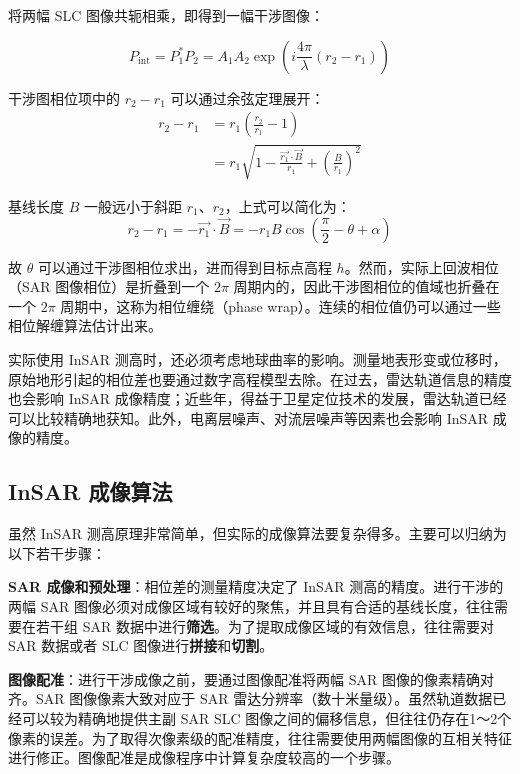 将两幅 SLC 图像共轭相乘，即得到一幅干涉图像：

\begin{equation}
    P_{\textrm{int}} = P_1^* P_2 =  A_1 A_2 \exp(i \frac{4\pi}{\lambda}(r_2 - r_1))
\end{equation}

干涉图相位项中的 $ r_2 - r_1 $ 可以通过余弦定理展开：
\begin{equation}
\begin{split}
    r_2 - r_1 &= r_1 (\frac{r_2}{r_1} - 1) \\
              &= r_1 \sqrt{1- \frac{\vec{r_1} \cdot \vec{B}}{r_1} + (\frac{B}{r_1})^2}
\end{split}
\end{equation}

基线长度 $B$ 一般远小于斜距 $r_1$、$r_2$，上式可以简化为：
\begin{equation}
    r_2 - r_1 = - \vec{r_1} \cdot \vec{B} = - r_1 B \cos(\frac{\pi}{2} - \theta + \alpha)
\end{equation}

故 $\theta$ 可以通过干涉图相位求出，进而得到目标点高程 $h$。然而，实际上回波相位（SAR 图像相位）是折叠到一个 $2\pi$ 周期内的，因此干涉图相位的值域也折叠在一个 $2\pi$ 周期中，这称为相位缠绕（phase wrap）。连续的相位值仍可以通过一些相位解缠算法估计出来。

实际使用 InSAR 测高时，还必须考虑地球曲率的影响。测量地表形变或位移时，原始地形引起的相位差也要通过数字高程模型去除。在过去，雷达轨道信息的精度也会影响 InSAR 成像精度；近些年，得益于卫星定位技术的发展，雷达轨道已经可以比较精确地获知。此外，电离层噪声、对流层噪声等因素也会影响 InSAR 成像的精度。

\subsection{InSAR 成像算法}

虽然 InSAR 测高原理非常简单，但实际的成像算法要复杂得多。主要可以归纳为以下若干步骤：

\textbf{SAR 成像和预处理}：相位差的测量精度决定了 InSAR 测高的精度。进行干涉的两幅 SAR 图像必须对成像区域有较好的聚焦，并且具有合适的基线长度，往往需要在若干组 SAR 数据中进行\textbf{筛选}。为了提取成像区域的有效信息，往往需要对 SAR 数据或者 SLC 图像进行\textbf{拼接}和\textbf{切割}。

\textbf{图像配准}：进行干涉成像之前，要通过图像配准将两幅 SAR 图像的像素精确对齐。SAR 图像像素大致对应于 SAR 雷达分辨率（数十米量级\cite{sandwell2011gmtsar}）。虽然轨道数据已经可以较为精确地提供主副 SAR SLC 图像之间的偏移信息，但往往仍存在1～2个像素的误差\cite{sandwell2011gmtsar}。为了取得次像素级的配准精度，往往需要使用两幅图像的互相关特征进行修正。图像配准是成像程序中计算复杂度较高的一个步骤。

